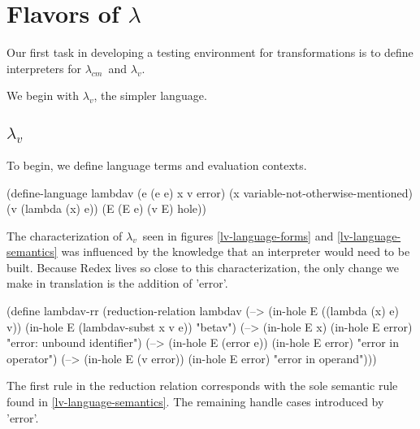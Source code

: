 \documentclass[ms,electronic,twosidetoc,letterpaper,chaptercenter,parttop]{byumsphd}
\newcommand{\lv}{$\lambda_v$}
\newcommand{\cm}{$\lambda_{cm}$}
\begin{document}
\section{Flavors of $\lambda$}

Our first task in developing a testing environment for transformations is to define interpreters for \cm\ and \lv.

We begin with \lv, the simpler language.

\subsection{\lv}


To begin, we define language terms and evaluation contexts.

\begin{singlespace}
\begin{schemedisplay}
(define-language lambdav
  (e (e e) x v error)
  (x variable-not-otherwise-mentioned)
  (v (lambda (x) e))
  (E (E e) (v E) hole))
\end{schemedisplay}
\end{singlespace}

The characterization of \lv\ seen in figures \ref{lv-language-forms} and
\ref{lv-language-semantics} was influenced by the knowledge that an interpreter would need
to be built. Because Redex lives so close to this characterization, the only change we
make in translation is the addition of \scheme'error'.

\begin{singlespace}
\begin{schemedisplay}
(define lambdav-rr
  (reduction-relation lambdav
   (--> (in-hole E ((lambda (x) e) v))
        (in-hole E (lambdav-subst x v e))
        "betav")
   (--> (in-hole E x)
        (in-hole E error)
        "error: unbound identifier")
   (--> (in-hole E (error e))
        (in-hole E error)
        "error in operator")
   (--> (in-hole E (v error))
        (in-hole E error)
        "error in operand")))
\end{schemedisplay}
\end{singlespace}

The first rule in the reduction relation corresponds with the sole semantic rule found in \ref{lv-language-semantics}. The remaining handle cases introduced by \scheme'error'.
\end{document}
